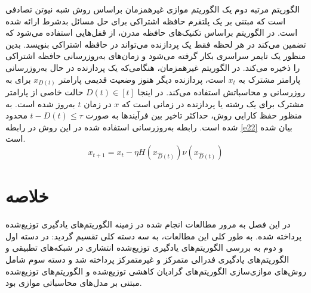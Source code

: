 الگوریتم مرتبه دوم  \cite{tong2020} یک الگوریتم موازی غیرهمزمان براساس روش شبه نیوتن تصادفی است که مبتنی بر یک پلتفرم حافظه اشتراکی برای حل مسائل بدشرط ارائه شده است. در الگوریتم  براساس تکنیک‌های حافظه مدرن، از قفل‌هایی استفاده می‌شود که تضمین می‌کند در هر لحظه فقط یک پردازنده می‌تواند در حافظه اشتراکی بنویسد. بدین منظور یک تایمر سراسری  بکار گرفته می‌شود و زمان‌های به‌روزرسانی حافظه اشتراکی را ذخیره می‌کند. در الگوریتم غیرهمزمان، هنگامی‌که یک پردازنده در حال به‌روزرسانی پارامتر مشترک  به $x_t$ است، پردازنده دیگر هنوز وضعیت قدیمی پارامتر $x_{D(t)}$ برای به روزرسانی و محاسباتش استفاده می‌کند. در اینجا $D(t)\in [t]$ حالت خاصی از پارامتر مشترک  برای یک رشته یا پردازنده در زمانی است که $x$ در زمان $t$  به‌روز شده است. به منظور حفظ کارایی روش، حداکثر تاخیر بین فرآیندها به صورت $t-D(t)\le \tau$ محدود شده است. رابطه به‌روزرسانی استفاده شده در این روش در رابطه \ref{e22} بیان شده است.
\begin{equation}\label{e22}
	x_{t+1}=x_t-\eta H(x_{\hat{D}(t)})\nu(x_{\hat{D}(t)})
\end{equation}


\section{خلاصه}
در این فصل به مرور مطالعات انجام شده در زمینه الگوریتم‌های یادگیری توزیع‌شده پرداخته شده. به طور کلی این مطالعات، به سه دسته کلی تقسیم گردید: در دسته اول و دوم به بررسی الگوریتم‌های یادگیری توزیع‌شده انتشاری در شبکه‌های تطبیقی و الگوریتم‌های یادگیری فدرالی متمرکز و غیرمتمرکز پرداخته شد و دسته سوم شامل روش‌های موازی‌سازی الگوریتم‌های گرادیان کاهشی توزیع‌شده و الگوریتم‌های توزیع‌شده مبتنی بر مدل‌های محاسباتی موازی بود. 